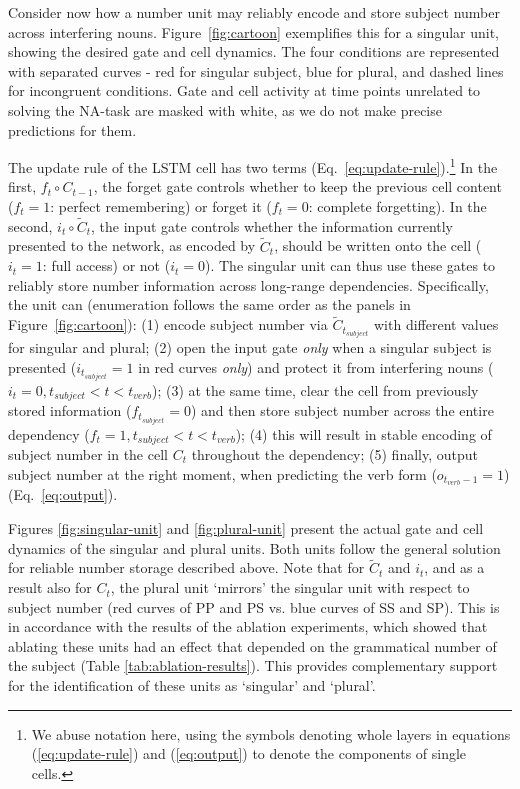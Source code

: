 Consider now how a number unit may reliably encode and store subject
number across interfering nouns.  Figure~\ref{fig:cartoon} exemplifies
this for a singular unit, showing the desired gate and cell
dynamics. The four conditions are represented with separated curves -
red for singular subject, blue for plural, and dashed lines for
incongruent conditions. Gate and cell activity at time points
unrelated to solving the NA-task are masked with white, as we do not
make precise predictions for them.

The update rule of the LSTM cell has two terms
(Eq.~\ref{eq:update-rule}).\footnote{We abuse notation here, using the
  symbols denoting whole layers in equations (\ref{eq:update-rule}) and
  (\ref{eq:output}) to denote the components of single cells.} In the
first, $f_t \circ{} C_{t-1}$, the forget gate controls whether to keep
the previous cell content ($f_t=1$: perfect remembering) or forget it
($f_t=0$: complete forgetting). In the second,
$i_t\circ{} \tilde{C}_t$, the input gate controls whether the
information currently presented to the network, as encoded by
$\tilde{C}_t$, should be written onto the cell ($i_t=1$: full access)
or not ($i_t=0$). The singular unit can thus use these gates to
reliably store number information across long-range
dependencies. Specifically, the unit can (enumeration follows the same order as the panels in Figure~\ref{fig:cartoon}): (1) encode subject
number via $\tilde{C}_{t_{subject}}$ with different values for
singular and plural; (2) open the input gate \textit{only} when a
singular subject is presented ($i_{t_{subject}} = 1$ in red curves \textit{only}) and protect it from interfering nouns ($i_t=0, t_{subject}<t<t_{verb}$); (3) at the same time,
clear the cell from previously stored information
($f_{t_{subject}}=0$) and then store subject number across the entire
dependency ($f_t=1, t_{subject}<t<t_{verb}$); (4) this will result in
stable encoding of subject number in the cell $C_t$ throughout the
dependency; (5) finally, output subject number at the right moment,
when predicting the verb form ($o_{t_{verb}-1}=1$)
(Eq.~\ref{eq:output}).

Figures \ref{fig:singular-unit} and \ref{fig:plural-unit} present the actual gate and cell dynamics of the singular and plural units. Both units follow the general solution for reliable number storage described above. Note that for $\tilde{C}_t$ and $i_t$, and as a result also for $C_t$, the plural unit `mirrors' the singular unit with respect to subject number (red curves of PP and PS vs. blue curves of SS and SP). This is in accordance with the results of the ablation experiments, which showed that ablating these units had an effect that depended on the grammatical number of the subject (Table \ref{tab:ablation-results}). This provides complementary support for the identification of these units as `singular' and `plural'.

